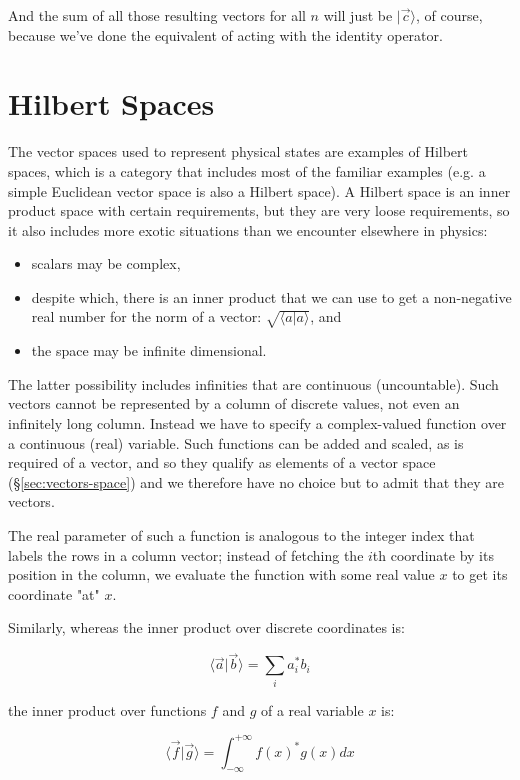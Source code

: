 And the sum of all those resulting vectors for all $n$ will just be $|\vec{c} \rangle$, of course, because we've done the equivalent of acting with the identity operator.

\section{Hilbert Spaces}

The vector spaces used to represent physical states are examples of Hilbert spaces, which is a category that includes most of the familiar examples (e.g. a simple Euclidean vector space is also a Hilbert space). A Hilbert space is an inner product space with certain requirements, but they are very loose requirements, so it also includes more exotic situations than we encounter elsewhere in physics:

\begin{itemize}
  \item scalars may be complex,
  \item despite which, there is an inner product that we can use to get a non-negative real number for the norm of a vector: $\sqrt{\langle a|a \rangle}$, and 
  \item the space may be infinite dimensional.
\end{itemize}

The latter possibility includes infinities that are continuous (uncountable). Such vectors cannot be represented by a column of discrete values, not even an infinitely long column. Instead we have to specify a complex-valued function over a continuous (real) variable. Such functions can be added and scaled, as is required of a vector, and so they qualify as elements of a vector space (§\ref{sec:vectors-space}) and we therefore have no choice but to admit that they are vectors.

The real parameter of such a function is analogous to the integer index that labels the rows in a column vector; instead of fetching the $i$th coordinate by its position in the column, we evaluate the function with some real value $x$ to get its coordinate "at" $x$.

Similarly, whereas the inner product over discrete coordinates is:

$$
\langle \vec{a} | \vec{b} \rangle
=
\sum_i
a_i^* b_i
$$

the inner product over functions $f$ and $g$ of a real variable $x$ is:

$$
\langle \vec{f} | \vec{g} \rangle
=
\int_{-\infty}^{+\infty}
f(x)^* g(x)
dx
$$

